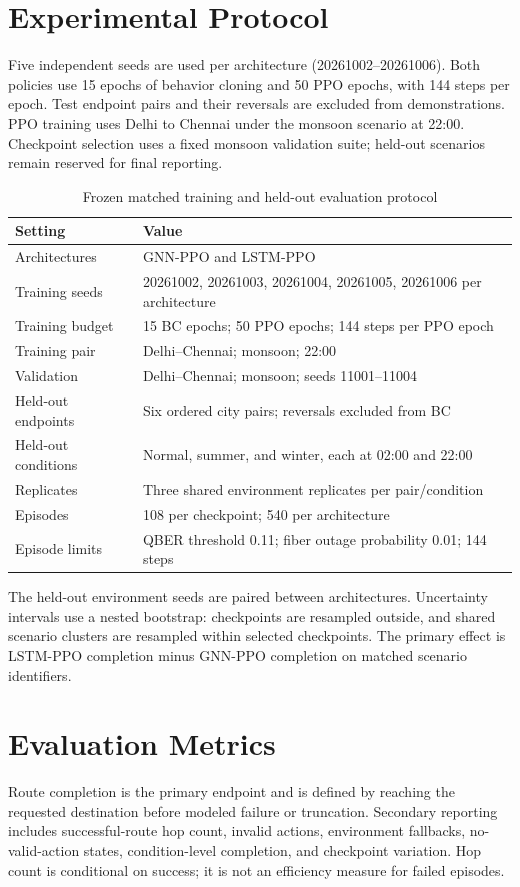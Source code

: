 \documentclass[12pt,a4paper,oneside]{report}
\begin{document}
\section{Experimental Protocol}
Five independent seeds are used per architecture (20261002--20261006). Both policies use 15 epochs of behavior cloning and 50 PPO epochs, with 144 steps per epoch. Test endpoint pairs and their reversals are excluded from demonstrations. PPO training uses Delhi to Chennai under the monsoon scenario at 22:00. Checkpoint selection uses a fixed monsoon validation suite; held-out scenarios remain reserved for final reporting.

\begin{table}[htbp]
\centering
\caption{Frozen matched training and held-out evaluation protocol}
\label{tab:protocol}
\small
\begin{tabular}{@{}p{1.8in}p{4.2in}@{}}
\toprule
Setting & Value \\
\midrule
Architectures & GNN-PPO and LSTM-PPO \\
Training seeds & 20261002, 20261003, 20261004, 20261005, 20261006 per architecture \\
Training budget & 15 BC epochs; 50 PPO epochs; 144 steps per PPO epoch \\
Training pair & Delhi--Chennai; monsoon; 22:00 \\
Validation & Delhi--Chennai; monsoon; seeds 11001--11004 \\
Held-out endpoints & Six ordered city pairs; reversals excluded from BC \\
Held-out conditions & Normal, summer, and winter, each at 02:00 and 22:00 \\
Replicates & Three shared environment replicates per pair/condition \\
Episodes & 108 per checkpoint; 540 per architecture \\
Episode limits & QBER threshold 0.11; fiber outage probability 0.01; 144 steps \\
\bottomrule
\end{tabular}
\end{table}

The held-out environment seeds are paired between architectures. Uncertainty intervals use a nested bootstrap: checkpoints are resampled outside, and shared scenario clusters are resampled within selected checkpoints. The primary effect is LSTM-PPO completion minus GNN-PPO completion on matched scenario identifiers.

\section{Evaluation Metrics}
Route completion is the primary endpoint and is defined by reaching the requested destination before modeled failure or truncation. Secondary reporting includes successful-route hop count, invalid actions, environment fallbacks, no-valid-action states, condition-level completion, and checkpoint variation. Hop count is conditional on success; it is not an efficiency measure for failed episodes.
\end{document}
